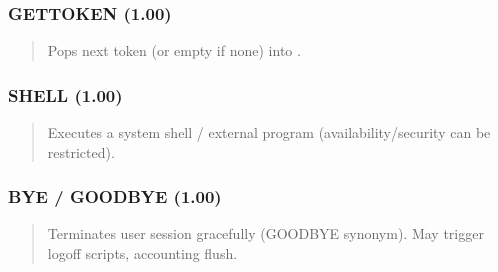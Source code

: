 \documentclass[letterpaper,10pt,english]{sphinxmanual}
\begin{document}
\subsubsection{GETTOKEN (1.00)}
\label{\detokenize{ppl:gettoken-1-00}}\begin{quote}

\sphinxAtStartPar
{}
\begin{description}
\sphinxAtStartPar
Pops next token (or empty if none) into .

\end{description}
\end{quote}


\subsubsection{SHELL (1.00)}
\label{\detokenize{ppl:shell-1-00}}\begin{quote}

\sphinxAtStartPar
{}
\begin{description}
\sphinxAtStartPar
Executes a system shell / external program (availability/security can be restricted).

\end{description}
\end{quote}


\subsubsection{BYE / GOODBYE (1.00)}
\label{\detokenize{ppl:bye-goodbye-1-00}}\begin{quote}

\sphinxAtStartPar
{}
\begin{description}
\sphinxAtStartPar
Terminates user session gracefully (GOODBYE synonym). May trigger logoff scripts, accounting flush.

\end{description}
\end{quote}
\end{document}
